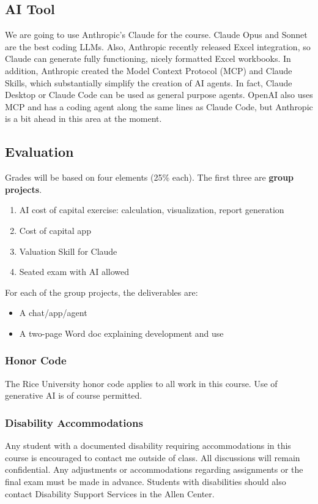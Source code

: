 \documentclass[11pt]{article}
\begin{document}
\subsection*{AI Tool}

We are going to use Anthropic's Claude for the course.  Claude Opus and Sonnet are the best coding LLMs.  Also, Anthropic recently released Excel integration, so Claude can generate fully functioning, nicely formatted Excel workbooks. In addition, Anthropic created the Model Context Protocol (MCP) and Claude Skills, which substantially simplify the creation of AI agents.  In fact, Claude Desktop or Claude Code can be used as general purpose agents.  OpenAI also uses MCP and has a coding agent along the same lines as Claude Code, but Anthropic is a bit ahead in this area at the moment.

\subsection*{Evaluation}

Grades will be based on four elements (25\% each).  The first three are \textbf{group projects}.

\begin{enumerate}\setlength{\itemsep}{0pt}
\item AI cost of capital exercise: calculation, visualization, report generation 
\item  Cost of capital app 
\item Valuation Skill for Claude
\item Seated exam with AI allowed 
\end{enumerate}
For each of the group projects, the deliverables are:
\begin{itemize}\setlength{\itemsep}{0pt}
\item A chat/app/agent
\item A two-page Word doc explaining development and use
\end{itemize}

\subsubsection*{Honor Code}
The Rice University honor code applies to all work in this course. Use of generative AI is of course permitted.

\subsubsection*{Disability Accommodations}
Any student with a documented disability requiring accommodations in this course is encouraged to contact me outside of class. All discussions will remain confidential. Any adjustments or accommodations regarding assignments or the final exam must be made in advance. Students with disabilities should also contact Disability Support Services in the Allen Center.
\end{document}
